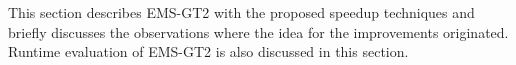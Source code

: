 This section describes EMS-GT2 with the proposed speedup techniques and briefly discusses the observations where the idea for the improvements originated. Runtime evaluation of EMS-GT2 is also discussed in this section.










